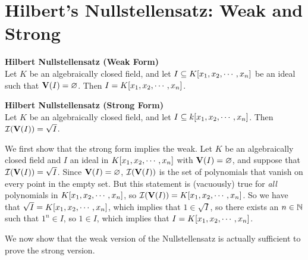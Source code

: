 \documentclass[twoside]{report}
\begin{document}
\section{Hilbert's Nullstellensatz: Weak and Strong}

\begin{theorem} \textbf{Hilbert Nullstellensatz (Weak Form)}\\ 

  Let $K$ be an algebraically closed field, and let $I \subseteq
  K[x_1, x_2,\cdots,x_n]$ be an ideal such that $\mathbf{V}(I) = \varnothing$.  Then $I =
  K[x_1, x_2,\cdots,x_n]$.
\end{theorem}

\begin{theorem} \textbf{Hilbert Nullstellensatz (Strong Form)}\\ 

  Let $K$ be an algebraically closed field, and let $I \subseteq
  k[x_1, x_2,\cdots,x_n]$.  Then $\mathcal{I}(\mathbf{V}(I)) = \sqrt{I}$.
\end{theorem}

We first show that the strong form implies the weak.  Let $K$ be an
algebraically closed field and $I$ an ideal in $K[x_1, x_2,\cdots,x_n]$ with
$\mathbf{V}(I) = \varnothing$, and suppose that $\mathcal{I}(\mathbf{V}(I)) =
\sqrt{I}$.  Since $\mathbf{V}(I) = \varnothing$, $\mathcal{I}(\mathbf{V}(I))$
is the set of polynomials that vanish on every point in the empty set.
But this statement is (vacuously) true for \emph{all} polynomials in
$K[x_1, x_2,\cdots,x_n]$, so $\mathcal{I}(\mathbf{V}(I)) = K[x_1, x_2,\cdots,x_n]$.  So we have that
$\sqrt{I} = K[x_1, x_2,\cdots,x_n]$, which implies that $1 \in \sqrt{I}$, so there
exists an $n \in \mathbb{N}$ such that $1^n \in I$, so $1 \in I$, which
implies that $I = K[x_1, x_2,\cdots,x_n]$.


We now show that the weak version of the Nullstellensatz is actually
sufficient to prove the strong version.




  


  



\end{document}

